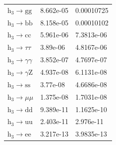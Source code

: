 \documentclass[12pt]{article}
\begin{document}
\begin{table}[htpb]
\begin{tabular}{lll}
			$\text{h}_3\to\text{gg}$   & 8.662e-05 & 0.00010725  \\
			$\text{h}_3\to\text{bb}$   & 8.158e-05 & 0.00010102  \\
			$\text{h}_3\to\text{cc}$   & 5.961e-06 & 7.3813e-06  \\
			$\text{h}_3\to\tau\tau$   & 3.89e-06  & 4.8167e-06  \\
			$\text{h}_3\to\gamma\gamma$   & 3.852e-07 & 4.7697e-07  \\
			$\text{h}_3\to\gamma\text{Z}$   & 4.937e-08 & 6.1131e-08  \\
			$\text{h}_3\to\text{ss}$   & 3.77e-08  & 4.6686e-08  \\
			$\text{h}_3\to\mu\mu$   & 1.375e-08 & 1.7031e-08  \\
			$\text{h}_3\to\text{dd}$   & 9.389e-11 & 1.1625e-10  \\
			$\text{h}_3\to\text{uu}$   & 2.403e-11 & 2.976e-11   \\
			$\text{h}_3\to\text{ee}$   & 3.217e-13 & 3.9835e-13 
		\end{tabular}
	\end{table}
\end{document}

